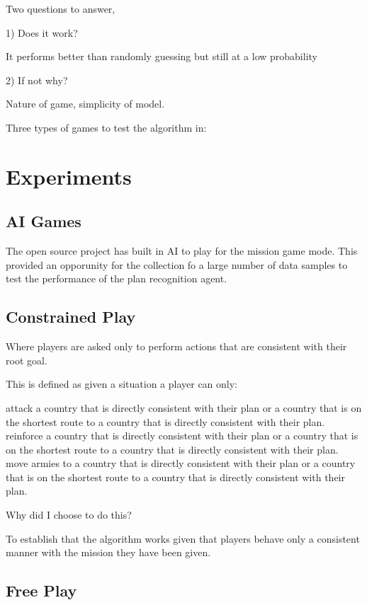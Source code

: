 \documentclass[parskip]{cs4rep}
\begin{document}
Two questions to answer, 

1) Does it work?

It performs better than randomly guessing but still at a low probability

2) If not why?

Nature of game, simplicity of model.

Three types of games to test the algorithm in:

\section{Experiments}

\subsection{AI Games}

The open source project has built in AI to play for the mission game mode. This provided an opporunity for the collection fo a large number of data samples to test the performance of the plan recognition agent.

\subsection{Constrained Play}

Where players are asked only to perform actions that are consistent with their root goal.

This is defined as given a situation a player can only:

attack a country that is directly consistent with their plan or a country that is on the shortest route to a country that is directly consistent with their plan.
reinforce a country that is directly consistent with their plan or a country that is on the shortest route to a country that is directly consistent with their plan.
move armies to a country that is directly consistent with their plan or a country that is on the shortest route to a country that is directly consistent with their plan.

Why did I choose to do this?

To establish that the algorithm works given that players behave only a consistent manner with the mission they have been given.

\subsection{Free Play}
\end{document}
